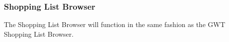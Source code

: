 \subsubsection{Shopping List Browser}

The Shopping List Browser will function in the same fashion as the GWT Shopping List Browser.
